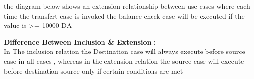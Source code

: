 \vspace{0.25cm}
the diagram below shows an extension relationship between use cases where each time the transfert case is invoked
the balance check case will be executed if the value is \textgreater= 10000 DA

\vspace{0.15cm}


        \begin{center}
    \end{center}

        \vspace{1cm}
\begin{tcolorbox}[title = Note]
 \textbf{Difference Between Inclusion \& Extension :}\\
In The inclusion relation the Destination case will always execute before source case in all cases , whereas
in the extension relation the source case will execute before destination source only if certain conditions
are met

\end{tcolorbox}
